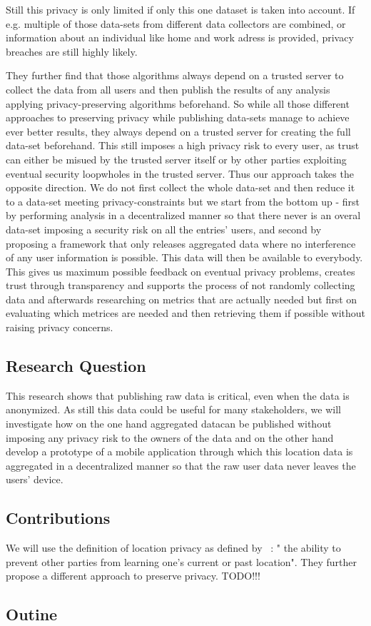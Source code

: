 Still this privacy is only limited if only this one dataset is taken into account. If e.g. multiple of those data-sets from different data collectors are combined, or information about an individual like home and work adress is provided, privacy breaches are still highly likely.

They further find that those algorithms always depend on a trusted server to collect the data from all users and then publish the results of any analysis applying privacy-preserving algorithms beforehand. So while all those different approaches to preserving privacy while publishing data-sets manage to achieve ever better results, they always depend on a trusted server for creating the full data-set beforehand. This still imposes a high privacy risk to every user, as trust can either be misued by the trusted server itself or by other parties exploiting eventual security loopwholes in the trusted server. 
Thus our approach takes the opposite direction. We do not first collect the whole data-set and then reduce it to a data-set meeting privacy-constraints but we start from the bottom up - first by performing analysis in a decentralized manner so that there never is an overal data-set imposing a security risk on all the entries' users, and second by proposing a framework that only releases aggregated data where no interference of any user information is possible. This data will then be available to everybody. This gives us maximum possible feedback on eventual privacy problems, creates trust through transparency and supports the process of not randomly collecting data and afterwards researching on metrics that are actually needed but first on evaluating which metrices are needed and then retrieving them if possible without raising privacy concerns.


\subsection{Research Question}

This research shows that publishing raw data is critical, even when the data is anonymized.
As still this data could be useful for many stakeholders, we will investigate how on the one hand aggregated datacan be published without imposing any privacy risk to the owners of the data and on the other hand develop a prototype of a mobile application through which this location data is aggregated in a decentralized manner so that the raw user data never leaves the users' device.

\subsection{Contributions}

We will use the definition of location privacy as defined by ~\parencite{location-privacy}: " the ability to prevent other parties from learning
one’s current or past location". They further propose a different approach to preserve privacy. TODO!!!

\subsection{Outine}